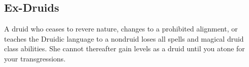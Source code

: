
    \subsection{Ex-Druids}
        A druid who ceases to revere nature, changes to a prohibited alignment, or teaches the Druidic language to a nondruid loses all spells and magical druid class abilities.
        She cannot thereafter gain levels as a druid until you atone for your transgressions.





